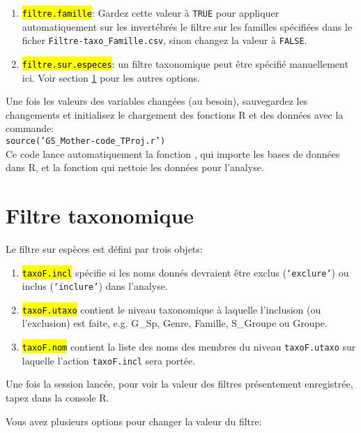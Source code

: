 \documentclass{article}
\begin{document}
\begin{enumerate}
\item \hl{\texttt{filtre.famille}}: Gardez cette valeur à
  \texttt{TRUE} pour appliquer automatiquement sur les invertébrés le
  filtre sur les familles spécifiées dans le ficher
  \texttt{Filtre-taxo\_Famille.csv}, sinon changez la valeur à
  \texttt{FALSE}.

\item \hl{\texttt{filtre.sur.especes}}: un filtre taxonomique peut
  être spécifié manuellement ici. Voir section \ref{ftaxo} pour les
  autres options.
\end{enumerate}

Une fois les valeurs des
variables changées (au besoin), sauvegardez les changements et
initialisez le chargement des fonctions R et des données avec la commande: \\
\texttt{source('GS\_Mother-code\_TProj.r')}\\

Ce code lance automatiquement la fonction ,
qui importe les bases de données dans R, et la fonction
 qui nettoie les données pour l'analyse.

\section{Filtre taxonomique} \label{ftaxo}

Le filtre sur espèces est défini par trois objets:

\begin{enumerate}
  \item \hl{\texttt{taxoF.incl}} spécifie si les noms donnés devraient être
    exclus (\texttt{`exclure'}) ou inclus (\texttt{`inclure'}) dans
    l'analyse.
  \item \hl{\texttt{taxoF.utaxo}} contient le niveau taxonomique à laquelle
    l'inclusion (ou l'exclusion) est faite, e.g. G\_Sp, Genre,
    Famille, S\_Groupe ou Groupe.
   \item \hl{\texttt{taxoF.nom}} contient la liste des noms des membres du
     niveau \texttt{taxoF.utaxo} sur laquelle l'action
     \texttt{taxoF.incl} sera portée.
\end{enumerate}

Une fois la session lancée, pour voir la valeur des filtres
présentement enregistrée, tapez  dans la
console R.

Vous avez plusieurs options pour changer la valeur du filtre:
\end{document}
